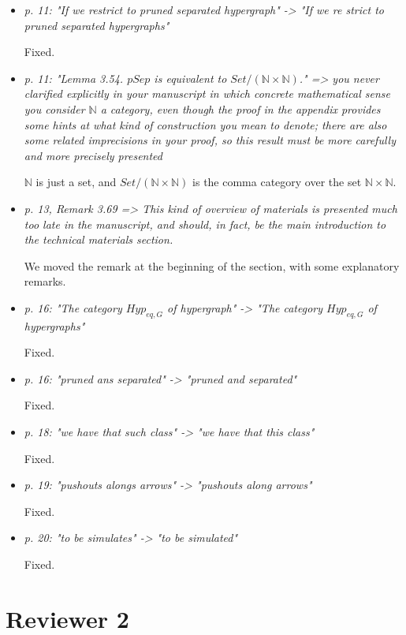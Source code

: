 \documentclass[english,11pt,a4paper]{article}
\begin{document}
\begin{itemize}
	\item \emph{ p. 11: "If we restrict to pruned separated hypergraph" -> "If we re
		strict to pruned separated hypergraphs"}
	
	
	Fixed.
	
	\item \emph{p. 11: "Lemma 3.54. $pSep$ is equivalent to $Set/(\mathbb{N}\times \mathbb{N})$." => you never clarified explicitly in your manuscript in which concrete mathematical sense you consider $\mathbb{N}$ a category, even though the proof in the appendix provides some hints at what kind of construction you mean to denote; there are also some related imprecisions in your proof, so this result must be more carefully and more precisely presented}
	
	$\mathbb{N}$ is just a set, and $Set/(\mathbb{N}\times \mathbb{N})$ is the comma category over the set $\mathbb{N}\times \mathbb{N}$.
	
	\item \emph{ p. 13, Remark 3.69 => This kind of overview of materials is presented much too late in the manuscript, and should, in fact, be the main introduction to the technical materials section.}
	
	We moved the remark at the beginning of the section, with some explanatory remarks.
	
	
	\item \emph{ p. 16: "The category $Hyp_{eq,G}$ of hypergraph" -> "The category $Hyp_{eq,G}$ of hypergraphs"}
	
	Fixed.
	
	\item \emph{ p. 16: "pruned ans separated" -> "pruned and separated"}
	
	Fixed.
	
	
	\item \emph{ p. 18: "we have that such class" -> "we have that this class"}
	
	Fixed.
	
	
	\item \emph{ p. 19: "pushouts alongs arrows" -> "pushouts along arrows"}
	
	Fixed.
	
	
	\item \emph{ p. 20: "to be simulates" -> "to be simulated"}
	
	Fixed.
\end{itemize}


\section*{Reviewer 2}
\end{document}
